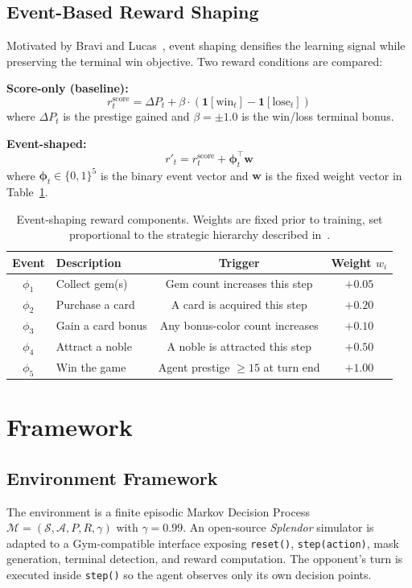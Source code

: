 \documentclass[11pt]{article}
\begin{document}
\subsection{Event-Based Reward Shaping}
Motivated by Bravi and Lucas~\cite{bravi2020}, event shaping densifies the learning signal
while preserving the terminal win objective. Two reward conditions are compared:

\textbf{Score-only (baseline):}
$$r_t^{\text{score}} = \Delta P_t + \beta \cdot (\mathbf{1}[\text{win}_t] - \mathbf{1}[\text{lose}_t])$$
where $\Delta P_t$ is the prestige gained and $\beta=\pm1.0$ is the win/loss terminal bonus.

\textbf{Event-shaped:}
$$r'_t = r_t^{\text{score}} + \boldsymbol{\phi}_t^\top\mathbf{w}$$
where $\boldsymbol{\phi}_t\in\{0,1\}^5$ is the binary event vector and
$\mathbf{w}$ is the fixed weight vector in Table~\ref{tab:events}.

\begin{table}[htbp]
\centering\small
\caption{Event-shaping reward components. Weights are fixed prior to training, set
proportional to the strategic hierarchy described in~\cite{bravi2020}.}
\label{tab:events}
\renewcommand{\arraystretch}{1.12}
\begin{tabular}{clcc}
\toprule
\textbf{Event} & \textbf{Description} & \textbf{Trigger} & \textbf{Weight $w_i$}\\
\midrule
$\phi_1$ & Collect gem(s)       & Gem count increases this step         & $+0.05$ \\
$\phi_2$ & Purchase a card      & A card is acquired this step          & $+0.20$ \\
$\phi_3$ & Gain a card bonus    & Any bonus-color count increases       & $+0.10$ \\
$\phi_4$ & Attract a noble      & A noble is attracted this step        & $+0.50$ \\
$\phi_5$ & Win the game         & Agent prestige $\geq 15$ at turn end  & $+1.00$ \\
\bottomrule
\end{tabular}
\end{table}

\newpage
\section{Framework}

\subsection{Environment Framework}
The environment is a finite episodic Markov Decision Process
$\mathcal{M}=(\mathcal{S},\mathcal{A},P,R,\gamma)$ with $\gamma=0.99$.
An open-source \textit{Splendor} simulator is adapted to a Gym-compatible interface
exposing \texttt{reset()}, \texttt{step(action)}, mask generation, terminal detection,
and reward computation. The opponent's turn is executed inside \texttt{step()} so the
agent observes only its own decision points.
\end{document}
